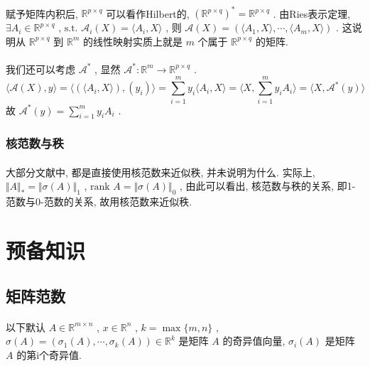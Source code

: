 \documentclass[a4paper, UTF8]{ctexart}				%
\numberwithin{equation}{section}				%
\begin{document}
				\paragraph{}
					\quad 赋予矩阵内积后, $\mathbb{R}^{p \times q}$ 可以看作Hilbert的, ${(\mathbb{R}^{p \times q})}^* = \mathbb{R}^{p \times q}$ . 由Ries表示定理, $\exists A_i \in \mathbb{R}^{p \times q}$ , $\text{s.t. } \mathcal{A}_i(X) = \langle{A_i},{X}\rangle$ , 则 $\mathcal{A}(X) =(\langle{A_1},{X}\rangle, \cdots, \langle{A_m},{X}\rangle)$ . 这说明从 $\mathbb{R}^{p \times q}$ 到 $\mathbb{R}^{m}$ 的线性映射实质上就是 $m$ 个属于 $\mathbb{R}^{p \times q}$ 的矩阵.

				\paragraph{}
					\quad 我们还可以考虑 ${\mathcal{A}}^*$ , 显然 $\mathcal{A}^* : \mathbb{R}^{m} \rightarrow \mathbb{R}^{p \times q}$ .
					\[
							\langle{\mathcal{A}(X), y}\rangle 
						=	\langle{(\langle{A_i, X}\rangle), (y_i)}\rangle
						=	\sum^m_{i = 1}y_i \langle{A_i, X}\rangle
						=	\langle{X, \sum^m_{i = 1}y_i A_i}\rangle
						=	\langle{X, \mathcal{A}^*(y)}\rangle
					\]
					故 $\mathcal{A}^*(y) = \sum^m_{i = 1}y_i A_i$ .
			\subsubsection{核范数与秩}
				\paragraph{}
					\quad 大部分文献中, 都是直接使用核范数来近似秩, 并未说明为什么. 实际上, $\Vert{A}\Vert_* = \Vert{\sigma(A)}\Vert_1$ , $\text{rank } A = \Vert{\sigma(A)}\Vert_0$ , 由此可以看出, 核范数与秩的关系, 即1-范数与0-范数的关系, 故用核范数来近似秩.

	\section{预备知识}
		\subsection{矩阵范数}
			\paragraph{}
				\quad 以下默认 $A \in \mathbb{R}^{m \times n}$ , $x \in \mathbb{R}^{n}$ , $k = \max \{m, n\}$ , $\sigma(A) = (\sigma_1(A), \cdots, \sigma_k(A)) \in \mathbb{R}^{k}$ 是矩阵 $A$ 的奇异值向量, $\sigma_i(A)$ 是矩阵 $A$ 的第i个奇异值.
\end{document}
